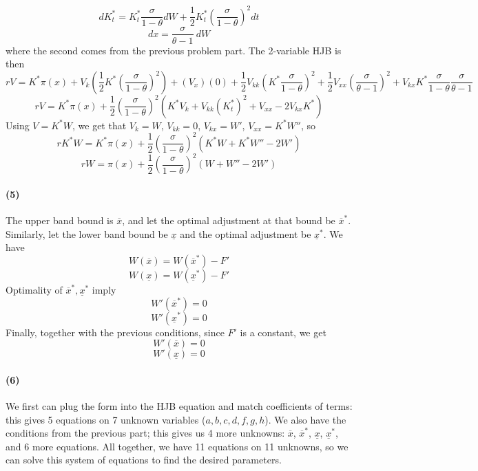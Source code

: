 \documentclass[10pt,letter]{article}
\newcommand{\problempart}[1]{\paragraph{#1}}
\begin{document}
\[ dK^*_t = K^*_t \frac{\sigma}{1-\theta} dW  + \frac{1}{2}K^*_t\left(\frac{\sigma }{1 - \theta}\right)^2 dt \]
\[ dx =  \frac{\sigma }{\theta - 1} \ dW  \]
where the second comes from the previous problem part. The 2-variable HJB is then
\[ rV = K^* \pi(x) + V_k\left(\frac{1}{2}K^* \left(\frac{\sigma }{1 - \theta}\right)^2 \right) + (V_x)(0) + \frac{1}{2}V_{kk}\left(K^* \frac{\sigma}{1-\theta}\right)^2 + \frac{1}{2}V_{xx} \left(\frac{\sigma }{\theta - 1} \right)^2 + V_{kx}K^* \frac{\sigma}{1-\theta}\frac{\sigma }{\theta - 1}  \]
\[ rV = K^* \pi(x) + \frac{1}{2} \left( \frac{\sigma }{1 - \theta}\right)^2 \left(K^*V_k + V_{kk} (K^*_t)^2 + V_{xx} - 2 V_{kx} K^* \right) \]
Using $V = K^* W$, we get that $V_k = W$, $V_{kk} = 0$, $V_{kx} = W'$, $V_{xx} = K^*W''$, so
\[ rK^*W = K^* \pi(x) + \frac{1}{2} \left( \frac{\sigma }{1 - \theta}\right)^2 \left(K^*W + K^*W'' - 2 W' \right) \]
\[ r W =  \pi(x) + \frac{1}{2} \left( \frac{\sigma }{1 - \theta}\right)^2 \left(W + W'' - 2 W'  \right) \]
\problempart{(5)}
The upper band bound is $\overline{x}$, and let the optimal adjustment at that bound be $\overline{x}^*$. Similarly, let the lower band bound be $\underline{x}$ and the optimal adjustment be $\underline{x}^*$. We have
\[ W(\overline{x}) = W(\overline{x}^*) - F' \]
\[ W(\underline{x}) = W(\underline{x}^*) - F' \]
Optimality of $\overline{x}^*, \underline{x}^*$ imply
\[ W'(\overline{x}^*) = 0 \]
\[ W'(\underline{x}^*) = 0 \]
Finally, together with the previous conditions, since $F'$ is a constant, we get
\[ W'(\overline{x}) = 0 \]
\[ W'(\underline{x}) = 0 \]
\problempart{(6)}
We first can plug the form into the HJB equation and match coefficients of terms: this gives 5 equations on 7 unknown variables ($a,b,c,d,f,g,h$). We also have the conditions from the previous part; this gives us 4 more unknowns: $\overline{x}$, $\overline{x}^*$, $\underline{x}$, $\underline{x}^*$, and 6 more equations. All together, we have 11 equations on 11 unknowns, so we can solve this system of equations to find the desired parameters.
\end{document}
